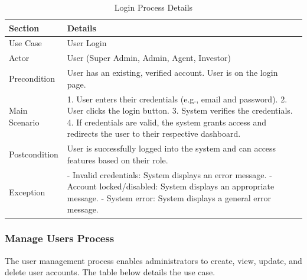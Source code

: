 \begin{table}[htbp]
    \centering
    \begin{tabular}{|l|p{}|}
        \hline
        \textbf{Section} & \textbf{Details} \\
        \hline
        Use Case & User Login \\
        \hline
        Actor & User (Super Admin, Admin, Agent, Investor) \\
        \hline
        Precondition & User has an existing, verified account. User is on the login page. \\
        \hline
        Main Scenario & 
        1. User enters their credentials (e.g., email and password).
        2. User clicks the login button.
        3. System verifies the credentials.
        4. If credentials are valid, the system grants access and redirects the user to their respective dashboard. \\
        \hline
        Postcondition & User is successfully logged into the system and can access features based on their role. \\
        \hline
        Exception & 
        - Invalid credentials: System displays an error message.
        - Account locked/disabled: System displays an appropriate message.
        - System error: System displays a general error message. \\
        \hline
    \end{tabular}
    \caption{Login Process Details}
    \label{tab:login_process}
\end{table}

\newpage
\subsubsection{Manage Users Process}
The user management process enables administrators to create, view, update, and delete user accounts. The table below details the use case.


